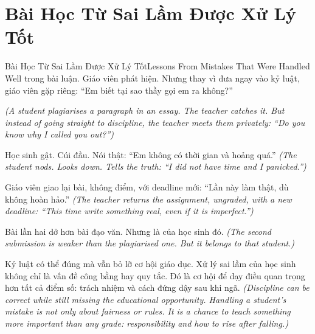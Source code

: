 \section{Bài Học Từ Sai Lầm Được Xử Lý Tốt}
\begin{truyen}{Bài Học Từ Sai Lầm Được Xử Lý Tốt}{Lessons From Mistakes That Were Handled Well}
 trong bài luận. Giáo viên phát hiện. Nhưng thay vì đưa ngay vào kỷ luật, giáo viên gặp riêng: ``Em biết tại sao thầy gọi em ra không?''

\textit{(A student plagiarises a paragraph in an essay. The teacher catches it. But instead of going straight to discipline, the teacher meets them privately: ``Do you know why I called you out?'')}

Học sinh gật. Cúi đầu. Nói thật: ``Em không có thời gian và hoảng quá.''
\textit{(The student nods. Looks down. Tells the truth: ``I did not have time and I panicked.'')}

Giáo viên giao lại bài, không điểm, với deadline mới: ``Lần này làm thật, dù không hoàn hảo.''
\textit{(The teacher returns the assignment, ungraded, with a new deadline: ``This time write something real, even if it is imperfect.'')}

Bài lần hai dở hơn bài đạo văn. Nhưng là của học sinh đó.
\textit{(The second submission is weaker than the plagiarised one. But it belongs to that student.)}

\begin{baihoc}
Kỷ luật có thể đúng mà vẫn bỏ lỡ cơ hội giáo dục. Xử lý sai lầm của học sinh không chỉ là vấn đề công bằng hay quy tắc. Đó là cơ hội để dạy điều quan trọng hơn tất cả điểm số: trách nhiệm và cách đứng dậy sau khi ngã.
\textit{(Discipline can be correct while still missing the educational opportunity. Handling a student's mistake is not only about fairness or rules. It is a chance to teach something more important than any grade: responsibility and how to rise after falling.)}
\end{baihoc}
\end{truyen}

